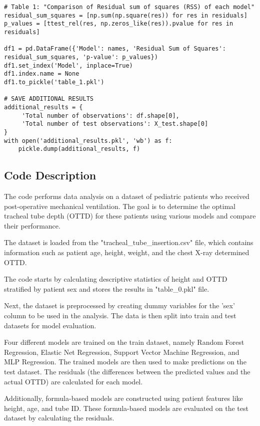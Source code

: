 \documentclass[11pt]{article}
\begin{document}
\begin{verbatim}
# Table 1: "Comparison of Residual sum of squares (RSS) of each model"
residual_sum_squares = [np.sum(np.square(res)) for res in residuals]
p_values = [ttest_rel(res, np.zeros_like(res)).pvalue for res in residuals]

df1 = pd.DataFrame({'Model': names, 'Residual Sum of Squares': residual_sum_squares, 'p-value': p_values})
df1.set_index('Model', inplace=True)
df1.index.name = None
df1.to_pickle('table_1.pkl')

# SAVE ADDITIONAL RESULTS
additional_results = {
     'Total number of observations': df.shape[0], 
     'Total number of test observations': X_test.shape[0]
}
with open('additional_results.pkl', 'wb') as f:
    pickle.dump(additional_results, f)

\end{verbatim}

\subsection{Code Description}

The code performs data analysis on a dataset of pediatric patients who received post-operative mechanical ventilation. The goal is to determine the optimal tracheal tube depth (OTTD) for these patients using various models and compare their performance. 

The dataset is loaded from the "tracheal\_tube\_insertion.csv" file, which contains information such as patient age, height, weight, and the chest X-ray determined OTTD. 

The code starts by calculating descriptive statistics of height and OTTD stratified by patient sex and stores the results in "table\_0.pkl" file. 

Next, the dataset is preprocessed by creating dummy variables for the 'sex' column to be used in the analysis. The data is then split into train and test datasets for model evaluation. 

Four different models are trained on the train dataset, namely Random Forest Regression, Elastic Net Regression, Support Vector Machine Regression, and MLP Regression. The trained models are then used to make predictions on the test dataset. The residuals (the differences between the predicted values and the actual OTTD) are calculated for each model.

Additionally, formula-based models are constructed using patient features like height, age, and tube ID. These formula-based models are evaluated on the test dataset by calculating the residuals. 
\end{document}
